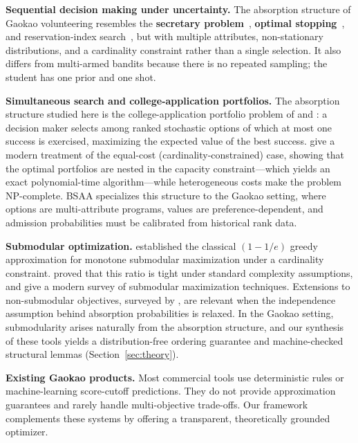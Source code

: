 \documentclass[11pt,a4paper]{article}
\begin{document}
\textbf{Sequential decision making under uncertainty.} The absorption structure of Gaokao volunteering resembles the \textbf{secretary problem}~\citep{ferguson1989secretary}, \textbf{optimal stopping}~\citep{shiryaev2007optimal}, and reservation-index search~\citep{weitzman1979optimal}, but with multiple attributes, non-stationary distributions, and a cardinality constraint rather than a single selection. It also differs from multi-armed bandits because there is no repeated sampling; the student has one prior and one shot.

\textbf{Simultaneous search and college-application portfolios.} The absorption structure studied here is the college-application portfolio problem of \citet{chade2006simultaneous} and \citet{kapur2022college}: a decision maker selects among ranked stochastic options of which at most one success is exercised, maximizing the expected value of the best success. \citet{kapur2022college} give a modern treatment of the equal-cost (cardinality-constrained) case, showing that the optimal portfolios are nested in the capacity constraint---which yields an exact polynomial-time algorithm---while heterogeneous costs make the problem NP-complete. BSAA specializes this structure to the Gaokao setting, where options are multi-attribute programs, values are preference-dependent, and admission probabilities must be calibrated from historical rank data.

\textbf{Submodular optimization.} \citet{nemhauser1978analysis} established the classical $(1-1/e)$ greedy approximation for monotone submodular maximization under a cardinality constraint. \citet{feige1998threshold} proved that this ratio is tight under standard complexity assumptions, and \citet{krause2014submodular} give a modern survey of submodular maximization techniques. Extensions to non-submodular objectives, surveyed by \citet{bian2017guarantees}, are relevant when the independence assumption behind absorption probabilities is relaxed. In the Gaokao setting, submodularity arises naturally from the absorption structure, and our synthesis of these tools yields a distribution-free ordering guarantee and machine-checked structural lemmas (Section~\ref{sec:theory}).

\textbf{Existing Gaokao products.} Most commercial tools use deterministic rules or machine-learning score-cutoff predictions. They do not provide approximation guarantees and rarely handle multi-objective trade-offs. Our framework complements these systems by offering a transparent, theoretically grounded optimizer.
\end{document}

